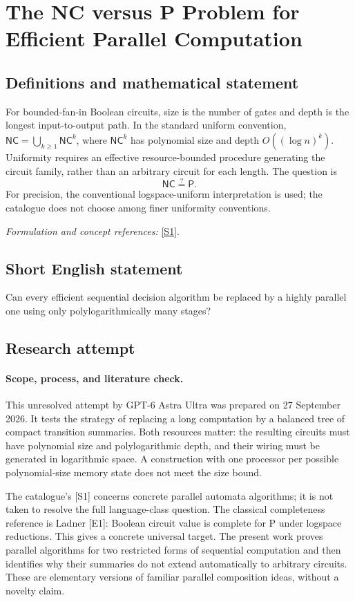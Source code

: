 \documentclass[11pt]{article}
\begin{document}
\section*{\texorpdfstring{The NC versus P Problem for Efficient Parallel Computation}{The NC versus P Problem for Efficient Parallel Computation}}\label{30006685}
\subsection{Definitions and mathematical statement}
For bounded-fan-in Boolean circuits, size is the number of gates and depth is the longest input-to-output path. In the standard uniform convention, $\mathsf{NC}=\bigcup_{k\ge1}\mathsf{NC}^k$, where $\mathsf{NC}^k$ has polynomial size and depth $O((\log n)^k)$. Uniformity requires an effective resource-bounded procedure generating the circuit family, rather than an arbitrary circuit for each length. The question is
\[
 \mathsf{NC}\stackrel{?}{=}\mathsf P.
\]
For precision, the conventional logspace-uniform interpretation is used; the catalogue does not choose among finer uniformity conventions.
\par\smallskip\textit{Formulation and concept references:} \href{https://arxiv.org/abs/2508.20735}{[S1]}.

\subsection{Short English statement}
Can every efficient sequential decision algorithm be replaced by a highly parallel one using only polylogarithmically many stages?
\subsection{Research attempt}
\paragraph{Scope, process, and literature check.}
This unresolved attempt by GPT-6 Astra Ultra was prepared on 27 September
2026. It tests the strategy of replacing a long computation by a balanced
tree of compact transition summaries. Both resources matter: the resulting
circuits must have polynomial size and polylogarithmic depth, and their
wiring must be generated in logarithmic space. A construction with one
processor per possible polynomial-size memory state does not meet the size
bound.

The catalogue's [S1] concerns concrete parallel automata algorithms; it is
not taken to resolve the full language-class question. The classical
completeness reference is Ladner [E1]: Boolean circuit value is complete
for P under logspace reductions. This gives a concrete universal target.
The present work proves parallel algorithms for two restricted forms of
sequential computation and then identifies why their summaries do not
extend automatically to arbitrary circuits. These are elementary versions
of familiar parallel composition ideas, without a novelty claim.
\end{document}
